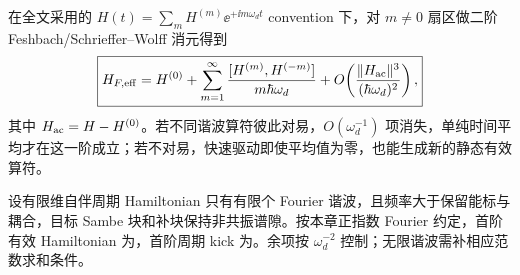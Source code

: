 在全文采用的 $H(t)=\sum_mH^{(m)}\ee^{+\ii m\omega_dt}$ convention 下，对 $m\neq0$ 扇区做二阶 Feshbach/Schrieffer--Wolff 消元得到
\begin{equation}
\boxed{
H_{F,\rm eff}
=H^{(0)}
+\sum_{m=1}^{\infty}
\frac{[H^{(m)},H^{(-m)}]}{m\hbar\omega_d}
+O\!\left(\frac{\|H_{\rm ac}\|^3}{(\hbar\omega_d)^2}\right),}
\label{eq:floquet_van_vleck_first_order_our_convention}
\end{equation}
其中 $H_{\rm ac}=H-H^{(0)}$。若不同谐波算符彼此对易，$O(\omega_d^{-1})$ 项消失，单纯时间平均才在这一阶成立；若不对易，快速驱动即使平均值为零，也能生成新的静态有效算符。

\begin{proposition}[有限谐波高频展开的首阶与微运动]
设有限维自伴周期 Hamiltonian 只有有限个 Fourier 谐波，且频率大于保留能标与耦合，目标 Sambe 块和补块保持非共振谱隙。按本章正指数 Fourier 约定，首阶有效 Hamiltonian 为，首阶周期 kick 为。余项按 $\omega_d^{-2}$ 控制；无限谐波需补相应范数求和条件。
\end{proposition}
